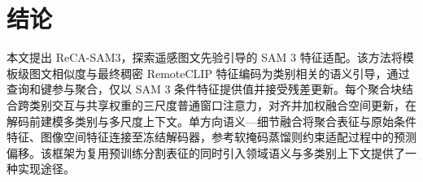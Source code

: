 \section{结论}
本文提出 ReCA-SAM3，探索遥感图文先验引导的 SAM 3 特征适配。该方法将模板级图文相似度与最终稠密 RemoteCLIP 特征编码为类别相关的语义引导，通过查询和键参与聚合，仅以 SAM 3 条件特征提供值并接受残差更新。每个聚合块结合跨类别交互与共享权重的三尺度普通窗口注意力，对齐并加权融合空间更新，在解码前建模多类别与多尺度上下文。单方向语义—细节融合将聚合表征与原始条件特征、图像空间特征连接至冻结解码器，参考软掩码蒸馏则约束适配过程中的预测偏移。该框架为复用预训练分割表征的同时引入领域语义与多类别上下文提供了一种实现途径。
